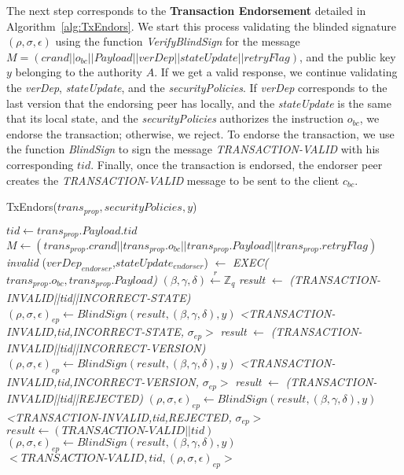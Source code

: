 \documentclass[conference]{llncs}
\begin{document}
The next step corresponds to the \textbf{Transaction Endorsement} detailed in Algorithm~\ref{alg:TxEndors}. We start this process validating the blinded signature $(\rho,\sigma,\epsilon)$ using the function \textit{VerifyBlindSign} for the message $M=(crand\vert\vert o_{bc} \vert\vert Payload \vert\vert verDep \vert\vert stateUpdate \vert\vert retryFlag)$, and the public key $y$ belonging to the authority $A$. If we get a valid response, we continue validating the \textit{verDep}, \textit{stateUpdate}, and the \textit{securityPolicies}. If \textit{verDep} corresponds to the last version that the endorsing peer has locally, and the \textit{stateUpdate} is the same that its local state, and the \textit{securityPolicies} authorizes the instruction $o_{bc}$, we endorse the transaction; otherwise, we reject. To endorse the transaction, we use the function \textit{BlindSign} to sign the message \textit{TRANSACTION-VALID} with his corresponding $tid$. Finally, once the transaction is endorsed, the endorser peer creates the \textit{TRANSACTION-VALID} message to be sent to the client $c_{bc}$.

\begin{algorithm}[ht]
\caption{TxEndors($trans_{prop},securityPolicies,y$)}
\label{alg:TxEndors}
\begin{algorithmic}[1]
\STATE $tid \gets trans_{prop}.Payload.tid$
\STATE $M \gets (trans_{prop}.crand\vert\vert trans_{prop}.o_{bc} \vert\vert trans_{prop}.Payload \vert\vert trans_{prop}.retryFlag)$
  \RETURN \emph{invalid} \ELSE
\STATE ($verDep_{endorser}$,$stateUpdate_{endorser}$) $\gets$  \emph{EXEC(}$trans_{prop}.o_{bc},trans_{prop}.Payload$\emph{)} \ENDIF
\STATE $(\beta,\gamma,\delta)\xleftarrow[]{r}\mathbb{Z}_q$  
\STATE \emph{result} $\gets$ \emph{(\textit{TRANSACTION-INVALID}||tid||\textit{INCORRECT-STATE})}
\STATE $(\rho,\sigma,\epsilon)_{ep} \gets BlindSign(result,(\beta,\gamma,\delta),y)$
\RETURN \emph{<\textit{TRANSACTION-INVALID},tid,\textit{INCORRECT-STATE},} $\sigma_{ep}>$ 
\STATE \emph{result} $\gets$ \emph{(\textit{TRANSACTION-INVALID}||tid||\textit{INCORRECT-VERSION})}
\STATE $(\rho,\sigma,\epsilon)_{ep} \gets BlindSign(result,(\beta,\gamma,\delta),y)$
\RETURN \emph{<\textit{TRANSACTION-INVALID},tid,\textit{INCORRECT-VERSION},} $\sigma_{ep}>$ 
\STATE \emph{result} $\gets$ \emph{(\textit{TRANSACTION-INVALID}||tid||\textit{REJECTED})}
\STATE $(\rho,\sigma,\epsilon)_{ep} \gets BlindSign(result,(\beta,\gamma,\delta),y)$
\RETURN \emph{<\textit{TRANSACTION-INVALID},tid,\textit{REJECTED},} $\sigma_{ep}>$
\ELSE  
\STATE $result \gets (\textit{TRANSACTION-VALID}||tid)$
\STATE $(\rho,\sigma,\epsilon)_{ep} \gets BlindSign(result,(\beta,\gamma,\delta),y)$
\RETURN $<\textit{TRANSACTION-VALID},tid,(\rho,\sigma,\epsilon)_{ep}>$
\ENDIF
\end{algorithmic}
\end{algorithm}
\end{document}
